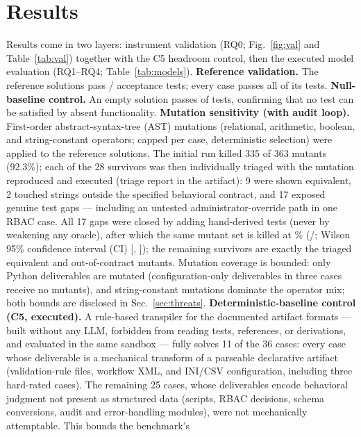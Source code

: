 \documentclass[journal]{IEEEtran}
\begin{document}
\section{Results}
\label{sec:results}
Results come in two layers: instrument validation (RQ0; Fig.~\ref{fig:val} and
Table~\ref{tab:val}) together with the C5 headroom control, then the executed model
evaluation (RQ1--RQ4; Table~\ref{tab:models}).
\textbf{Reference validation.} The reference solutions pass \RefPassed/\RefTotal{} acceptance
tests; every case passes all of its tests.
\textbf{Null-baseline control.} An empty solution passes \NullPassed{} of \RefTotal{} tests,
confirming that no test can be satisfied by absent functionality.
\textbf{Mutation sensitivity (with audit loop).} First-order abstract-syntax-tree (AST)
mutations (relational, arithmetic, boolean, and string-constant operators; capped per case,
deterministic selection) were applied to the reference solutions. The initial run killed
335 of 363 mutants (92.3\%); each of the 28 survivors was then individually triaged with the
mutation reproduced and executed (triage report in the artifact): 9 were shown equivalent, 2
touched strings outside the specified behavioral contract, and 17 exposed genuine test gaps
--- including an untested administrator-override path in one RBAC case. All 17 gaps were
closed by adding hand-derived tests (never by weakening any oracle), after which the same
mutant set is killed at \KillRate\% (\MutantsKilled/\NumMutants; Wilson 95\% confidence
interval (CI) [\KillRateCILo, \KillRateCIHi]); the \SurvivingMutants{} remaining survivors are exactly
the triaged equivalent and out-of-contract mutants. Mutation
coverage is bounded: only Python deliverables are mutated (configuration-only deliverables in
three cases receive no mutants), and string-constant mutations dominate the operator mix; both
bounds are disclosed in Sec.~\ref{sec:threats}.
\textbf{Deterministic-baseline control (C5, executed).} A rule-based transpiler for the
documented artifact formats --- built without any LLM, forbidden from reading tests,
references, or derivations, and evaluated in the same sandbox --- fully solves 11 of the 36
cases: every case whose deliverable is a mechanical transform of a parseable declarative
artifact (validation-rule files, workflow XML, and INI/CSV configuration, including three
hard-rated cases). The remaining 25 cases, whose deliverables encode behavioral judgment not
present as structured data (scripts, RBAC decisions, schema conversions, audit and
error-handling modules), were not mechanically attemptable. This bounds the benchmark's
\end{document}
